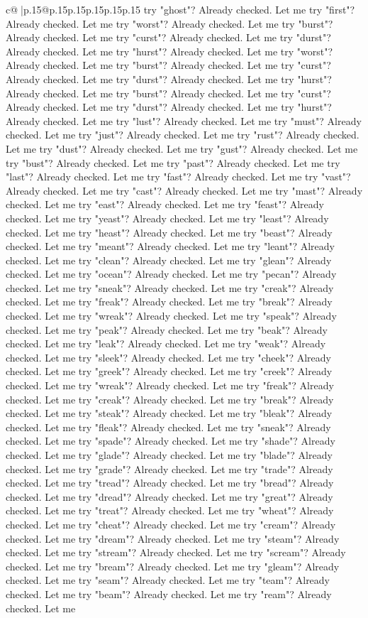 \documentclass{article}
\begin{document}
{\begin{supertabular}{c@{$\;$}|p{.15\linewidth}@{}p{.15\linewidth}p{.15\linewidth}p{.15\linewidth}p{.15\linewidth}p{.15\linewidth}}
{{{try "ghost"? Already checked. Let me try "first"? Already checked. Let me try "worst"? Already checked. Let me try "burst"? Already checked. Let me try "curst"? Already checked. Let me try "durst"? Already checked. Let me try "hurst"? Already checked. Let me try "worst"? Already checked. Let me try "burst"? Already checked. Let me try "curst"? Already checked. Let me try "durst"? Already checked. Let me try "hurst"? Already checked. Let me try "burst"? Already checked. Let me try "curst"? Already checked. Let me try "durst"? Already checked. Let me try "hurst"? Already checked. Let me try "lust"? Already checked. Let me try "must"? Already checked. Let me try "just"? Already checked. Let me try "rust"? Already checked. Let me try "dust"? Already checked. Let me try "gust"? Already checked. Let me try "bust"? Already checked. Let me try "past"? Already checked. Let me try "last"? Already checked. Let me try "fast"? Already checked. Let me try "vast"? Already checked. Let me try "cast"? Already checked. Let me try "mast"? Already checked. Let me try "east"? Already checked. Let me try "feast"? Already checked. Let me try "yeast"? Already checked. Let me try "least"? Already checked. Let me try "heast"? Already checked. Let me try "beast"? Already checked. Let me try "meant"? Already checked. Let me try "leant"? Already checked. Let me try "clean"? Already checked. Let me try "glean"? Already checked. Let me try "ocean"? Already checked. Let me try "pecan"? Already checked. Let me try "sneak"? Already checked. Let me try "creak"? Already checked. Let me try "freak"? Already checked. Let me try "break"? Already checked. Let me try "wreak"? Already checked. Let me try "speak"? Already checked. Let me try "peak"? Already checked. Let me try "beak"? Already checked. Let me try "leak"? Already checked. Let me try "weak"? Already checked. Let me try "sleek"? Already checked. Let me try "cheek"? Already checked. Let me try "greek"? Already checked. Let me try "creek"? Already checked. Let me try "wreak"? Already checked. Let me try "freak"? Already checked. Let me try "creak"? Already checked. Let me try "break"? Already checked. Let me try "steak"? Already checked. Let me try "bleak"? Already checked. Let me try "fleak"? Already checked. Let me try "sneak"? Already checked. Let me try "spade"? Already checked. Let me try "shade"? Already checked. Let me try "glade"? Already checked. Let me try "blade"? Already checked. Let me try "grade"? Already checked. Let me try "trade"? Already checked. Let me try "tread"? Already checked. Let me try "bread"? Already checked. Let me try "dread"? Already checked. Let me try "great"? Already checked. Let me try "treat"? Already checked. Let me try "wheat"? Already checked. Let me try "cheat"? Already checked. Let me try "cream"? Already checked. Let me try "dream"? Already checked. Let me try "steam"? Already checked. Let me try "stream"? Already checked. Let me try "scream"? Already checked. Let me try "bream"? Already checked. Let me try "gleam"? Already checked. Let me try "seam"? Already checked. Let me try "team"? Already checked. Let me try "beam"? Already checked. Let me try "ream"? Already checked. Let me }}}
\end{supertabular}}
\end{document}
